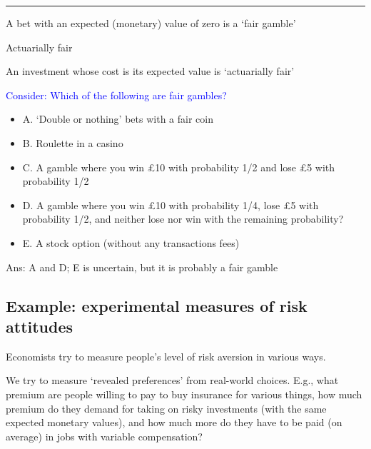 \documentclass[]{article}
\providecommand{\tightlist}{%
  \setlength{\itemsep}{0pt}\setlength{\parskip}{0pt}}
\begin{document}
\begin{center}\rule{0.5\linewidth}{\linethickness}\end{center}

\begin{description}
\tightlist
\item[Fair gamble]
A bet with an expected (monetary) value of zero is a `fair gamble'
\end{description}

\bigskip

Actuarially fair

An investment whose cost is its expected value is `actuarially fair'

\bigskip

\textcolor{blue}{Consider: Which of the following are fair gambles?}

\begin{itemize}
\tightlist
\item
  A. `Double or nothing' bets with a fair coin
\item
  B. Roulette in a casino
\item
  C. A gamble where you win £10 with probability 1/2 and lose £5 with
  probability 1/2
\item
  D. A gamble where you win £10 with probability 1/4, lose £5 with
  probability 1/2, and neither lose nor win with the remaining
  probability?
\item
  E. A stock option (without any transactions fees)
\end{itemize}

Ans: A and D; E is uncertain, but it is probably a fair gamble

\hypertarget{example-experimental-measures-of-risk-attitudes}{%
\subsection{Example: experimental measures of risk
attitudes}\label{example-experimental-measures-of-risk-attitudes}}

Economists try to measure people's level of risk aversion in various
ways.

We try to measure `revealed preferences' from real-world choices. E.g.,
what premium are people willing to pay to buy insurance for various
things, how much premium do they demand for taking on risky investments
(with the same expected monetary values), and how much more do they have
to be paid (on average) in jobs with variable compensation?

\bigskip
\end{document}
